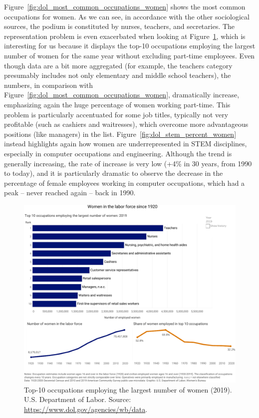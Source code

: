 Figure~\ref{fig:dol_most_common_occupations_women} shows the most common occupations for women. As we can see, in accordance with the other sociological sources, the podium is constituted by nurses, teachers, and secretaries. The representation problem is even exacerbated when looking at Figure~\ref{fig:dol_occupations_over_time}, which is interesting for us because it displays the top-10 occupations employing the largest number of women for the same year without excluding part-time employees. Even though data are a bit more aggregated (for example, the teachers category presumably includes not only elementary and middle school teachers), the numbers, in comparison with Figure~\ref{fig:dol_most_common_occupations_women}, dramatically increase, emphasizing again the huge percentage of women working part-time. This problem is particularly accentuated for some job titles, typically not very profitable (such as cashiers and waitresses), which overcome more advantageous positions (like managers) in the list. Figure~\ref{fig:dol_stem_percent_women} instead highlights again how women are underrepresented in STEM disciplines, especially in computer occupations and engineering. Although the trend is generally increasing, the rate of increase is very low (+4\% in 30 years, from 1990 to today), and it is particularly dramatic to observe the decrease in the percentage of female employees working in computer occupations, which had a peak -- never reached again -- back in 1990.

\begin{figure}[t!]
\includegraphics[scale=.7]{figures/dol_occupations_over_time.pdf}
\centering
\caption{Top-10 occupations employing the largest number of women (2019).\newline
U.S. Department of Labor. Source: \upshape\protect\url{https://www.dol.gov/agencies/wb/data}.}
\label{fig:dol_occupations_over_time}
\end{figure}

